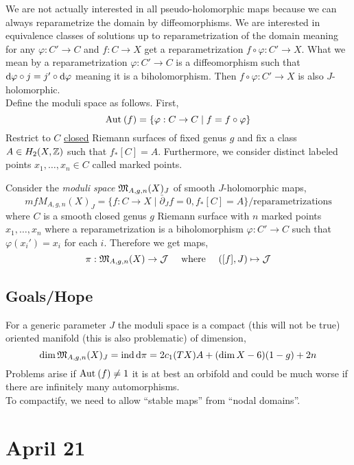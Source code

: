 \documentclass[12pt]{article}
\newcommand{\dbar}{\bar{\partial}}
\DeclareMathOperator{\ind}{\mathrm{ind}}
\begin{document}
We are not actually interested in all pseudo-holomorphic maps because we can always reparametrize the domain by diffeomorphisms. We are interested in equivalence classes of solutions up to reparametrization of the domain meaning for any $\varphi : C' \to C$ and $f : C \to X$ get a reparametrization $f \circ \varphi : C' \to X$. What we mean by a reparametrization $\varphi : C' \to C$ is a diffeomorphism such that $\mathrm{d}{\varphi} \circ j = j' \circ \mathrm{d}{\varphi}$ meaning it is a biholomorphism. Then $f \circ \varphi : C' \to X$ is also $J$-holomorphic. 
\bigskip\\
Define the moduli space as follows. First, 
\[ \mathrm{Aut}_{} \left( f \right) = \{ \varphi : C \to C \mid f = f \circ \varphi \} \]
Restrict to $C$ \underline{closed} Riemann surfaces of fixed genus $g$ and fix a class $A \in H_2(X, \mathbb{Z})$ such that $f_* [C] = A$. Furthermore, we consider distinct labeled points $x_1, \dots, x_n \in C$ called marked points. 

\begin{defn}
Consider the \textit{moduli space} $\mathfrak{M}_{A, g, n}(X)_J$ of smooth $J$-holomorphic maps,
\[ mf{M}_{A, g, n}(X)_J = \{ f : C \to X \mid \dbar_J f = 0, f_* [C] = A \} / \text{reparametrizations} \]
where $C$ is a smooth closed genus $g$ Riemann surface with $n$ marked points $x_1, \dots, x_n$ where a reparametrization is a biholomorphism $\varphi : C' \to C$ such that $\varphi(x_i') = x_i$ for each $i$. Therefore we get maps,
\[ \pi : \mathfrak{M}_{A, g, n}(X) \to \mathcal{J} \quad \text{ where } \quad ([f], J) \mapsto \mathcal{J} \]
\end{defn}

\subsection{Goals/Hope}

For a generic parameter $J$ the moduli space is a compact (this will not be true) oriented manifold (this is also problematic) of dimension,
\[ \dim{\mf{M}_{A,g,n}(X)_J} = \ind{\d{\pi}} = 2 c_1(TX) A + (\dim{X} - 6)(1-g) + 2n \]
Problems arise if $\mathrm{Aut}_{} \left( f \right) \neq 1$ it is at best an orbifold and could be much worse if there are infinitely many automorphisms. 
\bigskip\\
To compactify, we need to allow ``stable maps'' from ``nodal domains''.

\renewcommand{\K}[2]{#1}
\renewcommand{\S}[3]{#1 #3{#2#3}}

\newcommand{\test}[2]{#1 {#2}}


\section{April 21}
\end{document}
